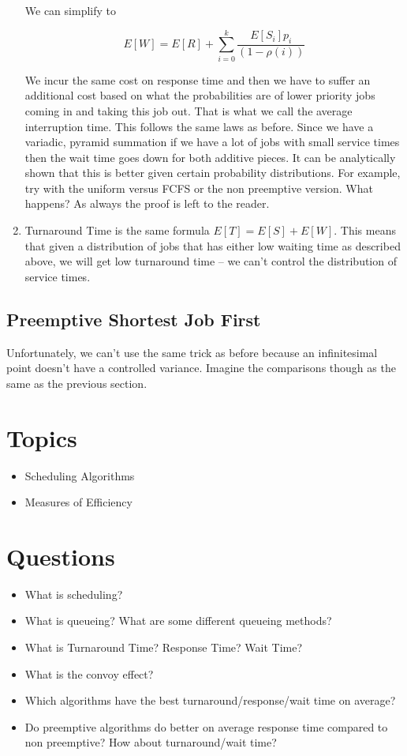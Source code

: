 \begin{enumerate}
  We can simplify to

  \[
  E[W] = E[R] + \sum\limits_{i=0}^k \frac{E[S_i]p_i}{(1 - \rho(i))}
  \]

  We incur the same cost on response time and then we have to suffer an additional cost based on what the probabilities are of lower priority jobs coming in and taking this job out.
  That is what we call the average interruption time.
  This follows the same laws as before.
  Since we have a variadic, pyramid summation if we have a lot of jobs with small service times then the wait time goes down for both additive pieces.
  It can be analytically shown that this is better given certain probability distributions.
  For example, try with the uniform versus FCFS or the non preemptive version.
  What happens?
  As always the proof is left to the reader.

\item Turnaround Time is the same formula $E[T] = E[S] + E[W]$. This means that given a distribution of jobs that has either low waiting time as described above, we will get low turnaround time -- we can't control the distribution of service times.
\end{enumerate}

\subsection{Preemptive Shortest Job First}

Unfortunately, we can't use the same trick as before because an infinitesimal point doesn't have a controlled variance.
Imagine the comparisons though as the same as the previous section.

\section{Topics}

\begin{itemize}
\tightlist
\item
  Scheduling Algorithms
\item
  Measures of Efficiency
\end{itemize}

\section{Questions}

\begin{itemize}
\tightlist
\item
  What is scheduling?
\item
  What is queueing? What are some different queueing methods?
\item
  What is Turnaround Time? Response Time? Wait Time?
\item
  What is the convoy effect?
\item
  Which algorithms have the best turnaround/response/wait time on average?
\item
  Do preemptive algorithms do better on average response time compared to non preemptive? How about turnaround/wait time?
\end{itemize}



